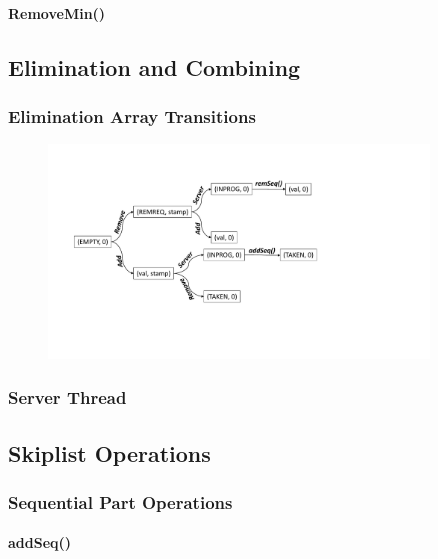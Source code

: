 \paragraph{RemoveMin()}

\subsection{Elimination and Combining}

\subsubsection{Elimination Array Transitions}

\begin{figure}[htb]
	\centering
	\includegraphics[width=0.9\textwidth]{graphics/combining-state.pdf}
	\caption{\cite{calciu_adaptive_2014}}
	\label{fig:combining-state}
\end{figure}

\subsubsection{Server Thread}

\subsection{Skiplist Operations}

\subsubsection{Sequential Part Operations}

\paragraph{addSeq()}

